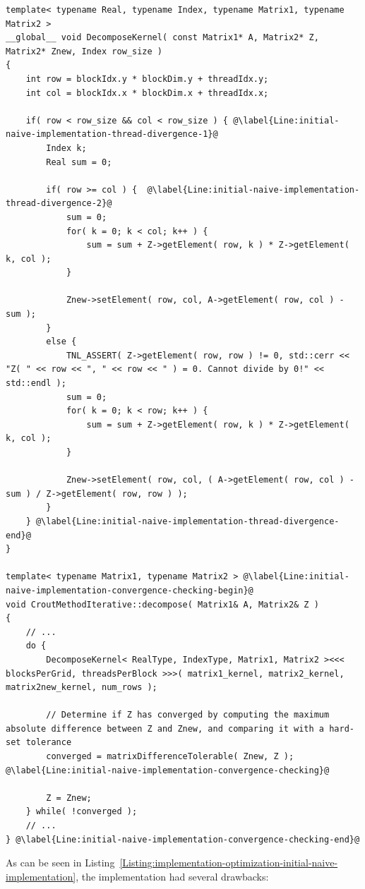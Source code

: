 \begin{lstlisting}[caption={Initial naive implementation of the GPU version of the Iterative Crout method. Taken from the Decomposition project repository on GitLab\protect\footref{Footnote:decomposition-project-gitlab-url}.},label={Listing:implementation-optimization-initial-naive-implementation},escapechar=@]
template< typename Real, typename Index, typename Matrix1, typename Matrix2 >
__global__ void DecomposeKernel( const Matrix1* A, Matrix2* Z, Matrix2* Znew, Index row_size )
{
	int row = blockIdx.y * blockDim.y + threadIdx.y;
	int col = blockIdx.x * blockDim.x + threadIdx.x;
	
	if( row < row_size && col < row_size ) { @\label{Line:initial-naive-implementation-thread-divergence-1}@
		Index k;
		Real sum = 0;
		
		if( row >= col ) {  @\label{Line:initial-naive-implementation-thread-divergence-2}@
			sum = 0;
			for( k = 0; k < col; k++ ) {
				sum = sum + Z->getElement( row, k ) * Z->getElement( k, col );
			}
			
			Znew->setElement( row, col, A->getElement( row, col ) - sum );
		}
		else {
			TNL_ASSERT( Z->getElement( row, row ) != 0,	std::cerr << "Z( " << row << ", " << row << " ) = 0. Cannot divide by 0!" << std::endl );
			sum = 0;
			for( k = 0; k < row; k++ ) {
				sum = sum + Z->getElement( row, k ) * Z->getElement( k, col );
			}
			
			Znew->setElement( row, col, ( A->getElement( row, col ) - sum ) / Z->getElement( row, row ) );
		}
	} @\label{Line:initial-naive-implementation-thread-divergence-end}@
}

template< typename Matrix1, typename Matrix2 > @\label{Line:initial-naive-implementation-convergence-checking-begin}@
void CroutMethodIterative::decompose( Matrix1& A, Matrix2& Z )
{
	// ...
	do {
		DecomposeKernel< RealType, IndexType, Matrix1, Matrix2 ><<< blocksPerGrid, threadsPerBlock >>>( matrix1_kernel, matrix2_kernel, matrix2new_kernel, num_rows );
		
		// Determine if Z has converged by computing the maximum absolute difference between Z and Znew, and comparing it with a hard-set tolerance
		converged = matrixDifferenceTolerable( Znew, Z ); @\label{Line:initial-naive-implementation-convergence-checking}@
		
		Z = Znew;
	} while( !converged );
	// ...
} @\label{Line:initial-naive-implementation-convergence-checking-end}@
\end{lstlisting}

As can be seen in Listing~\ref{Listing:implementation-optimization-initial-naive-implementation}, the implementation had several drawbacks:

